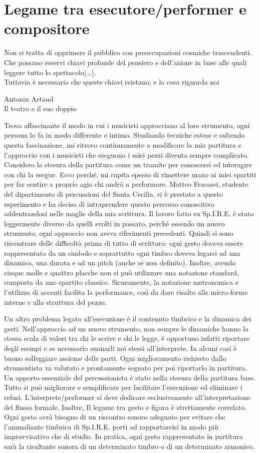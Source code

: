 \section{Legame tra esecutore/performer 
e compositore}

\epigraph{
Non si tratta di opprimere il pubblico con preoccupazioni cosmiche trascendenti. Che possano esservi chiavi profonde del pensiero e dell'azione in base alle quali leggere tutto lo spettacolo[...]. \\ Tuttavia è necessario che queste chiavi esistano; e la cosa riguarda noi}{Antonin Artaud \\ Il teatro e il suo doppio}

Trovo affascinante il modo in cui i musicisti approcciano al loro strumento, ogni persona lo fa in modo differente e intimo. Studiando tecniche estese e subendo questa fascinazione, mi ritrovo continuamente a modificare la mia partitura e l'approccio con i musicisti che eseguono i miei pezzi diventa sempre complicato. Considero la stesura della partitura come un tramite per conoscersi ed interagire con chi la esegue. Ecco perché, mi capita spesso di rimettere mano ai miei spartiti per far sentire a proprio agio chi andrà a performare. Matteo Fracassi, studente del dipartimento di percussioni del Santa Cecilia, si è prestato a questo esperimento e ha deciso di intraprendere questo percorso conoscitivo addentrandosi nelle maglie della mia scrittura.
Il lavoro fatto su Sp.I.R.E. è stato leggermente diverso da quelli svolti in passato, perché essendo un nuovo strumento, ogni approccio non aveva riferimenti precedenti. Quindi si sono riscontrare delle difficoltà prima di tutto di scrittura: ogni gesto doveva essere rappresentato da un simbolo e soprattutto ogni timbro doveva legarsi ad una dinamica, una durata e ad un pitch (anche se non definito). Inoltre, avendo cinque molle e quattro placche non si può utilizzare una notazione standard, composta da uno spartito classico. Sicuramente, la notazione metronomica e l'utilizzo di accenti facilita la performance, così da dare risalto alle micro-forme interne e alla struttura del pezzo.

Un altro problema legato all'esecuzione è il contenuto timbrico e la dinamica dei gesti. Nell'approccio ad un nuovo strumento, non sempre le dinamiche hanno la stessa scala di valori tra chi le scrive e chi le legge, è opportuno infatti riportare degli esempi e se necessario suonarli noi stessi all'interprete. In alcuni casi è buono solfeggiare assieme delle parti. Ogni miglioramento richiesto dallo strumentista va valutato e prontamente segnato per poi riportarlo in partitura. Un apporto essenziale del percussionista è stato nella stesura della partitura base. Tutto si può migliorare e semplificare per facilitare l'esecuzione ed eliminare i refusi. L'interprete/performer si deve dedicare esclusivamente all'interpretazione del flusso formale. Inoltre, Il legame tra gesto e figura è strettamente correlato. Ogni gesto avrà bisogno di un riscontro sonoro adeguato per evitare che l'ammaliante timbrica di Sp.I.R.E. porti ad rapportarcisi in modo più improvvisativo che di studio. In pratica, ogni gesto rappresentato in partitura sarà la risultante sonora di un determinato timbro o di un determinato armonico.

